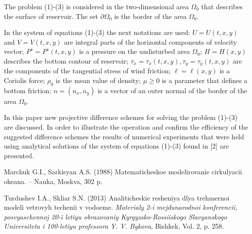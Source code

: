\documentclass[12pt,a4paper,reqno]{amsart}
\begin{document}
The problem (1)-(3) is considered in the two-dimensional area $\Omega_0$ that
 describes the surface of reservoir. The set $\partial \Omega_0$ is the border
 of the area $\Omega_0$.

In the system of equations (1)-(3) the next notations are used: $U = U(t, x, y)$ and
 $V = V(t, x, y)$ are integral parts of the horizontal components of velocity vector;
 $P^s = P^{s}(t, x, y)$ is a pressure on the undisturbed area $\Omega_0$; $H = H(x, y)$
 describes the bottom contour of reservoir; $\tau_x = \tau_{x}(t, x, y), \tau_y =
 \tau_{y}(t, x, y)$ are the components of the tangential stress of wind friction; $\ell =
 \ell(x, y)$ is a Coriolis force; $\rho_0$ is the mean value of density; $\mu \ge 0$
 is a parameter that defines a bottom friction; $n = (n_x, n_y)$ is a vector of an
 outer normal of the border of the area $\Omega_0$.

In this paper new projective difference schemes for solving the problem (1)-(3) are
 discussed. In order to illustrate the operation and confirm the efficiency of the
 suggested difference schemes the results of numerical experiments that were held using
 analytical solutions of the system of equations (1)-(3) found in [2] are presented.

\begin{thebibliography}{2}

\bibitem{} Marchuk G.I., Sarkisyan A.S. (1988) Matematicheskoe modelirovanie
 cirkulyacii okeana. – Nauka, Moskva, 302 p.

\bibitem{} Turdushev I.A., Skliar S.N. (2013) Analiticheskie resheniya dlya
 trehmernoi modeli vetrovyh techenii v vodoeme. {\it {Materialy 2-i mejdunarodnoi
 konferencii, posvyaschennoj 20-i letiyu obrazovaniy Kyrgyzsko-Rossiiskogo Slavyanskogo
 Universiteta i 100-letiyu professora Y. V. Bykova}}, Bishkek, Vol. 2, p. 258.

\end{thebibliography}
\end{document}
